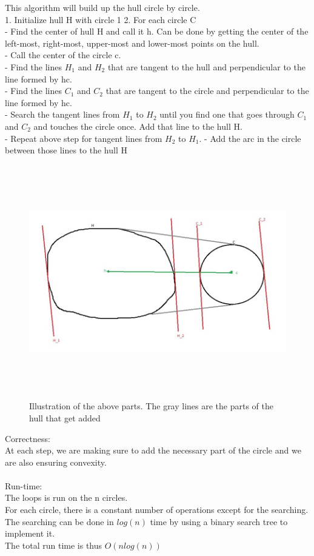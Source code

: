 \documentclass[11pt,psfig]{article}
\begin{document}
This algorithm will build up the hull circle by circle.\\
1. Initialize hull H with circle 1
2. For each circle C\\
	- Find the center of hull H and call it h. Can be done by getting the center of the left-most, right-most, upper-most and lower-most points on the hull. \\
	- Call the center of the circle c. \\
	- Find the lines $H_1$ and $H_2$ that are tangent to the hull and perpendicular to the line formed by hc. \\
	- Find the lines $C_1$ and $C_2$ that are tangent to the circle and perpendicular to the line formed by hc. \\
	- Search the tangent lines from $H_1$ to $H_2$ until you find one that goes through $C_1$ and $C_2$ and touches the circle once. Add that line to the hull H. \\
	- Repeat above step for tangent lines from $H_2$ to $H_1$. 
	- Add the arc in the circle between those lines to the hull H\\
\begin{figure}[H]
\centering
\includegraphics[height=4in]{hw1prob1-10e.jpg}
\caption{Illustration of the above parts. The gray lines are the parts of the hull that get added}
\end{figure}
Correctness:\\
At each step, we are making sure to add the necessary part of the circle and we are also ensuring convexity.\\
\\
Run-time:\\
The loops is run on the n circles. \\
For each circle, there is a constant number of operations except for the searching. \\
The searching can be done in $log(n)$ time by using a binary search tree to implement it. \\
The total run time is thus $O(n log(n) )$
\newpage
\end{document}
